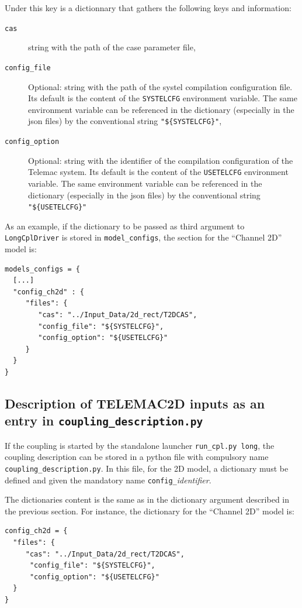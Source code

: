 Under this key is a dictionnary that gathers the following keys and information:
\begin{description}
\item[\texttt{cas}] string with the path of the case parameter file,
\item[\texttt{config\_file}] Optional: string with the
  path of the systel compilation configuration file. Its default is the content of the
  \texttt{SYSTELCFG} environment variable. The same environment
  variable can be referenced in the dictionary (especially in the json
  files) by the conventional string \texttt{"\$\{SYSTELCFG\}"},
\item[\texttt{config\_option}] Optional: string with the identifier of
  the compilation configuration of the Telemac system. Its default is the content of the
  \texttt{USETELCFG} environment variable. The same environment
  variable can be referenced in the dictionary (especially in the json
  files) by the conventional string \texttt{"\$\{USETELCFG\}"}
\end{description}

As an example, if the dictionary to be passed as third argument to
\texttt{LongCplDriver} is stored in \texttt{model\_configs}, the
section for the ``Channel 2D'' model is:
\begin{verbatim}
models_configs = {
  [...]
  "config_ch2d" : {
     "files": {
        "cas": "../Input_Data/2d_rect/T2DCAS",
        "config_file": "${SYSTELCFG}",
        "config_option": "${USETELCFG}"
     }
  }
}
\end{verbatim}

\subsection{Description of TELEMAC2D inputs as an entry in \texttt{coupling\_description.py}}
If the coupling is started by the standalone launcher
\texttt{run\_cpl.py long}, the coupling description can be stored in
a python file with compulsory name  \texttt{coupling\_description.py}.  In this file,
for the 2D model, a dictionary must be defined and given the mandatory name
\texttt{config\_}{\em identifier}.

The dictionaries content is the same as in the dictionary argument described in
the previous section. For instance, the dictionary for the ``Channel 2D'' model is:

\begin{verbatim}
config_ch2d = {
  "files": {
     "cas": "../Input_Data/2d_rect/T2DCAS",
      "config_file": "${SYSTELCFG}",
      "config_option": "${USETELCFG}"
  }
}
\end{verbatim}

